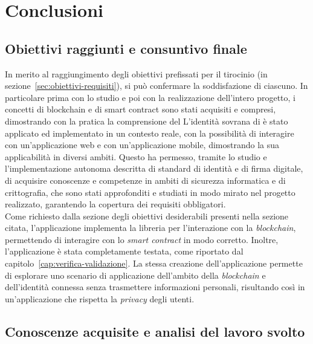 \chapter{Conclusioni}\label{cap:conclusioni}


\section{Obiettivi raggiunti e consuntivo finale}\label{sec:conclusioni-obiettivi-consuntivo}

In merito al raggiungimento degli obiettivi prefissati per il tirocinio (in sezione~\ref{sec:obiettivi-requisiti}),
si può confermare la soddisfazione di ciascuno. In particolare prima con lo studio e poi con la realizzazione dell'intero progetto,
i concetti di blockchain e di smart contract sono stati acquisiti e compresi, dimostrando con la pratica la comprensione del
L'identità sovrana di  è stato applicato ed implementato in un contesto reale, con la possibilità di
interagire con un'applicazione web e con un'applicazione mobile, dimostrando la sua applicabilità in diversi ambiti.
Questo ha permesso, tramite lo studio e l'implementazione autonoma descritta di standard di identità e di firma digitale, di 
acquisire conoscenze e competenze in ambiti di sicurezza informatica e di crittografia, che sono stati approfonditi e studiati
in modo mirato nel progetto realizzato, garantendo la copertura dei requisiti obbligatori. \\

Come richiesto dalla sezione degli obiettivi desiderabili presenti nella sezione citata, l'applicazione implementa la libreria 
 per l'interazione con la \textit{blockchain}, permettendo di interagire con lo \textit{smart contract} in modo corretto.
Inoltre, l'applicazione è stata completamente testata, come riportato dal capitolo~\ref{cap:verifica-validazione}. 
La stessa creazione dell'applicazione permette di esplorare uno scenario di applicazione dell'ambito della \textit{blockchain} e dell'identità connessa
senza trasmettere informazioni personali, risultando così in un'applicazione che rispetta la \textit{privacy} degli utenti.

\section{Conoscenze acquisite e analisi del lavoro svolto}\label{sec:conclusioni-conoscenze-lavoro}

